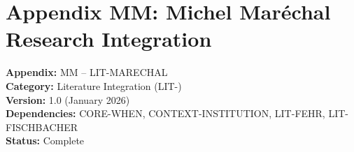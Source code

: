 
\chapter*{Appendix MM: Michel Maréchal Research Integration}
\label{app:marechal}

\begin{tcolorbox}[colback=white,colframe=black!75!white,title=Appendix Metadata]
\textbf{Appendix:} MM -- LIT-MARECHAL \\
\textbf{Category:} Literature Integration (LIT-) \\
\textbf{Version:} 1.0 (January 2026) \\
\textbf{Dependencies:} CORE-WHEN, CONTEXT-INSTITUTION, LIT-FEHR, LIT-FISCHBACHER \\
\textbf{Status:} Complete
\end{tcolorbox}

